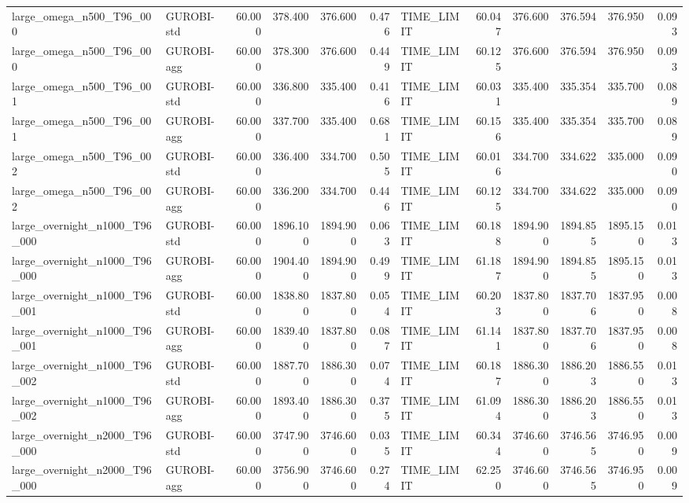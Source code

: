 \begin{table}[htbp]
\begin{tabular}{llrrrrlrrrrr}
large\_omega\_n500\_T96\_000 & GUROBI-std & 60.000 & 378.400 & 376.600 & 0.476 & TIME\_LIMIT & 60.047 & 376.600 & 376.594 & 376.950 & 0.093 \\
large\_omega\_n500\_T96\_000 & GUROBI-agg & 60.000 & 378.300 & 376.600 & 0.449 & TIME\_LIMIT & 60.125 & 376.600 & 376.594 & 376.950 & 0.093 \\
large\_omega\_n500\_T96\_001 & GUROBI-std & 60.000 & 336.800 & 335.400 & 0.416 & TIME\_LIMIT & 60.031 & 335.400 & 335.354 & 335.700 & 0.089 \\
large\_omega\_n500\_T96\_001 & GUROBI-agg & 60.000 & 337.700 & 335.400 & 0.681 & TIME\_LIMIT & 60.156 & 335.400 & 335.354 & 335.700 & 0.089 \\
large\_omega\_n500\_T96\_002 & GUROBI-std & 60.000 & 336.400 & 334.700 & 0.505 & TIME\_LIMIT & 60.016 & 334.700 & 334.622 & 335.000 & 0.090 \\
large\_omega\_n500\_T96\_002 & GUROBI-agg & 60.000 & 336.200 & 334.700 & 0.446 & TIME\_LIMIT & 60.125 & 334.700 & 334.622 & 335.000 & 0.090 \\
large\_overnight\_n1000\_T96\_000 & GUROBI-std & 60.000 & 1896.100 & 1894.900 & 0.063 & TIME\_LIMIT & 60.188 & 1894.900 & 1894.855 & 1895.150 & 0.013 \\
large\_overnight\_n1000\_T96\_000 & GUROBI-agg & 60.000 & 1904.400 & 1894.900 & 0.499 & TIME\_LIMIT & 61.187 & 1894.900 & 1894.855 & 1895.150 & 0.013 \\
large\_overnight\_n1000\_T96\_001 & GUROBI-std & 60.000 & 1838.800 & 1837.800 & 0.054 & TIME\_LIMIT & 60.203 & 1837.800 & 1837.706 & 1837.950 & 0.008 \\
large\_overnight\_n1000\_T96\_001 & GUROBI-agg & 60.000 & 1839.400 & 1837.800 & 0.087 & TIME\_LIMIT & 61.141 & 1837.800 & 1837.706 & 1837.950 & 0.008 \\
large\_overnight\_n1000\_T96\_002 & GUROBI-std & 60.000 & 1887.700 & 1886.300 & 0.074 & TIME\_LIMIT & 60.187 & 1886.300 & 1886.203 & 1886.550 & 0.013 \\
large\_overnight\_n1000\_T96\_002 & GUROBI-agg & 60.000 & 1893.400 & 1886.300 & 0.375 & TIME\_LIMIT & 61.094 & 1886.300 & 1886.203 & 1886.550 & 0.013 \\
large\_overnight\_n2000\_T96\_000 & GUROBI-std & 60.000 & 3747.900 & 3746.600 & 0.035 & TIME\_LIMIT & 60.344 & 3746.600 & 3746.565 & 3746.950 & 0.009 \\
large\_overnight\_n2000\_T96\_000 & GUROBI-agg & 60.000 & 3756.900 & 3746.600 & 0.274 & TIME\_LIMIT & 62.250 & 3746.600 & 3746.565 & 3746.950 & 0.009 \\

\end{tabular}
\end{table}
